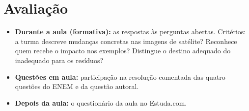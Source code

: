 \documentclass[11pt]{article}
\begin{document}
\section{Avaliação}
\begin{itemize}
  \item \textbf{Durante a aula (formativa):} as respostas às perguntas abertas. Critérios: a turma descreve
        mudanças concretas nas imagens de satélite? Reconhece quem recebe o impacto nos exemplos? Distingue o
        destino adequado do inadequado para os resíduos?
  \item \textbf{Questões em aula:} participação na resolução comentada das quatro questões do ENEM e da questão autoral.
  \item \textbf{Depois da aula:} o questionário da aula no Estuda.com.
\end{itemize}
\end{document}
